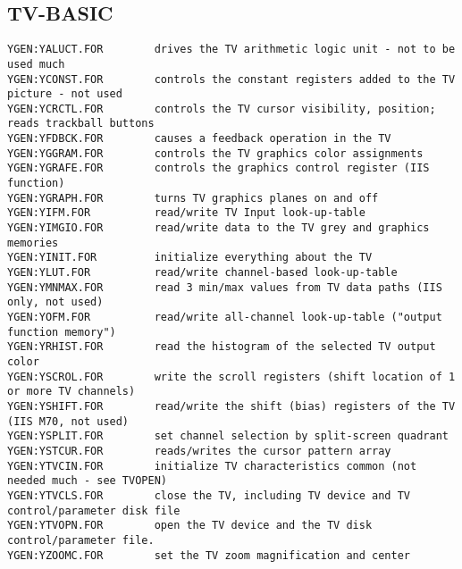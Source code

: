 \subsection{TV-BASIC}
\begin{verbatim}
YGEN:YALUCT.FOR        drives the TV arithmetic logic unit - not to be used much
YGEN:YCONST.FOR        controls the constant registers added to the TV picture - not used
YGEN:YCRCTL.FOR        controls the TV cursor visibility, position; reads trackball buttons
YGEN:YFDBCK.FOR        causes a feedback operation in the TV
YGEN:YGGRAM.FOR        controls the TV graphics color assignments
YGEN:YGRAFE.FOR        controls the graphics control register (IIS function)
YGEN:YGRAPH.FOR        turns TV graphics planes on and off
YGEN:YIFM.FOR          read/write TV Input look-up-table
YGEN:YIMGIO.FOR        read/write data to the TV grey and graphics memories
YGEN:YINIT.FOR         initialize everything about the TV
YGEN:YLUT.FOR          read/write channel-based look-up-table
YGEN:YMNMAX.FOR        read 3 min/max values from TV data paths (IIS only, not used)
YGEN:YOFM.FOR          read/write all-channel look-up-table ("output function memory")
YGEN:YRHIST.FOR        read the histogram of the selected TV output color
YGEN:YSCROL.FOR        write the scroll registers (shift location of 1 or more TV channels)
YGEN:YSHIFT.FOR        read/write the shift (bias) registers of the TV (IIS M70, not used)
YGEN:YSPLIT.FOR        set channel selection by split-screen quadrant
YGEN:YSTCUR.FOR        reads/writes the cursor pattern array
YGEN:YTVCIN.FOR        initialize TV characteristics common (not needed much - see TVOPEN)
YGEN:YTVCLS.FOR        close the TV, including TV device and TV control/parameter disk file
YGEN:YTVOPN.FOR        open the TV device and the TV disk control/parameter file.
YGEN:YZOOMC.FOR        set the TV zoom magnification and center
\end{verbatim}
 
